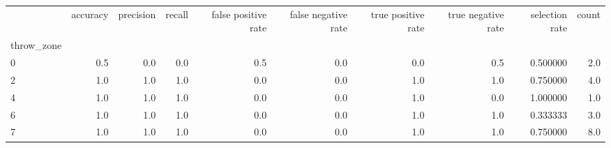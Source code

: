 \begin{tabular}{lrrrrrrrrr}
\toprule
{} &  accuracy &  precision &  recall &  false positive rate &  false negative rate &  true positive rate &  true negative rate &  selection rate &  count \\
throw\_zone &           &            &         &                      &                      &                     &                     &                 &        \\
\midrule
0          &       0.5 &        0.0 &     0.0 &                  0.5 &                  0.0 &                 0.0 &                 0.5 &        0.500000 &    2.0 \\
2          &       1.0 &        1.0 &     1.0 &                  0.0 &                  0.0 &                 1.0 &                 1.0 &        0.750000 &    4.0 \\
4          &       1.0 &        1.0 &     1.0 &                  0.0 &                  0.0 &                 1.0 &                 0.0 &        1.000000 &    1.0 \\
6          &       1.0 &        1.0 &     1.0 &                  0.0 &                  0.0 &                 1.0 &                 1.0 &        0.333333 &    3.0 \\
7          &       1.0 &        1.0 &     1.0 &                  0.0 &                  0.0 &                 1.0 &                 1.0 &        0.750000 &    8.0 \\
\bottomrule
\end{tabular}
